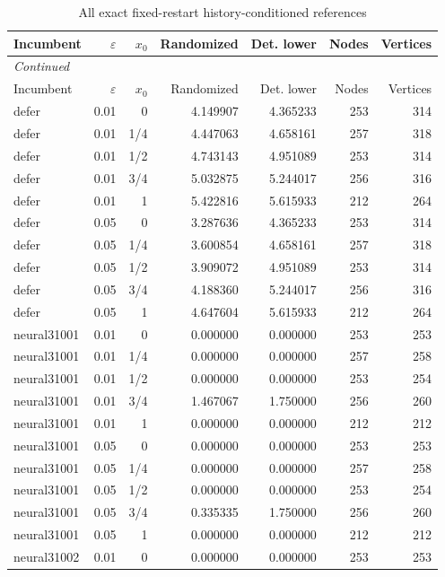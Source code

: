 {\small\setlength{\tabcolsep}{4pt}\begin{longtable}{lrrrrrr}
\caption{All exact fixed-restart history-conditioned references}\label{tab:all_frontiers}\\
\toprule
Incumbent & $\varepsilon$ & $x_0$ & Randomized & Det. lower & Nodes & Vertices \\
\midrule\endfirsthead
\multicolumn{7}{l}{\emph{Continued}}\\\toprule
Incumbent & $\varepsilon$ & $x_0$ & Randomized & Det. lower & Nodes & Vertices \\
\midrule\endhead
defer & 0.01 & 0 & 4.149907 & 4.365233 & 253 & 314 \\
defer & 0.01 & 1/4 & 4.447063 & 4.658161 & 257 & 318 \\
defer & 0.01 & 1/2 & 4.743143 & 4.951089 & 253 & 314 \\
defer & 0.01 & 3/4 & 5.032875 & 5.244017 & 256 & 316 \\
defer & 0.01 & 1 & 5.422816 & 5.615933 & 212 & 264 \\
defer & 0.05 & 0 & 3.287636 & 4.365233 & 253 & 314 \\
defer & 0.05 & 1/4 & 3.600854 & 4.658161 & 257 & 318 \\
defer & 0.05 & 1/2 & 3.909072 & 4.951089 & 253 & 314 \\
defer & 0.05 & 3/4 & 4.188360 & 5.244017 & 256 & 316 \\
defer & 0.05 & 1 & 4.647604 & 5.615933 & 212 & 264 \\
neural31001 & 0.01 & 0 & 0.000000 & 0.000000 & 253 & 253 \\
neural31001 & 0.01 & 1/4 & 0.000000 & 0.000000 & 257 & 258 \\
neural31001 & 0.01 & 1/2 & 0.000000 & 0.000000 & 253 & 254 \\
neural31001 & 0.01 & 3/4 & 1.467067 & 1.750000 & 256 & 260 \\
neural31001 & 0.01 & 1 & 0.000000 & 0.000000 & 212 & 212 \\
neural31001 & 0.05 & 0 & 0.000000 & 0.000000 & 253 & 253 \\
neural31001 & 0.05 & 1/4 & 0.000000 & 0.000000 & 257 & 258 \\
neural31001 & 0.05 & 1/2 & 0.000000 & 0.000000 & 253 & 254 \\
neural31001 & 0.05 & 3/4 & 0.335335 & 1.750000 & 256 & 260 \\
neural31001 & 0.05 & 1 & 0.000000 & 0.000000 & 212 & 212 \\
neural31002 & 0.01 & 0 & 0.000000 & 0.000000 & 253 & 253 \\

\end{longtable}}
